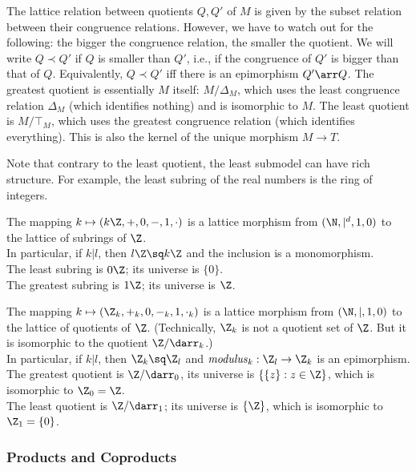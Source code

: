 The lattice relation between quotients $Q,Q'$ of $M$ is given by the subset relation between their congruence relations.
However, we have to watch out for the following: the bigger the congruence relation, the smaller the quotient.
We will write $Q\prec Q'$ if $Q$ is smaller than $Q'$, i.e., if the congruence of $Q'$ is bigger than that of $Q$.
Equivalently, $Q\prec Q'$ iff there is an epimorphism $Q'\arr Q$.
The greatest quotient is essentially $M$ itself: $M/\Delta_M$, which uses the least congruence relation $\Delta_M$ (which identifies nothing) and is isomorphic to $M$.
The least quotient is $M/\top_M$, which uses the greatest congruence relation (which identifies everything).
This is also the kernel of the unique morphism $M\to T$.

Note that contrary to the least quotient, the least submodel can have rich structure.
For example, the least subring of the real numbers is the ring of integers.

\begin{example}\quad
\begin{compactitem}
\item The mapping $k\mapsto (k\Z,+,0,-,1,\cdot)$ is a lattice morphism from $(\N,|^d,1,0)$ to the lattice of subrings of $\Z$.\\
In particular, if $k|l$, then $l\Z\sq k\Z$ and the inclusion is a monomorphism.\\
The least subring is $0\Z$; its universe is $\{0\}$.\\
The greatest subring is $1\Z$; its universe is $\Z$.
\item The mapping $k\mapsto (\Z_k,+_k,0,-_k,1,\cdot_k)$ is a lattice morphism from $(\N,|,1,0)$ to the lattice of quotients of $\Z$.
(Technically, $\Z_k$ is not a quotient set of $\Z$. But it is isomorphic to the quotient $\Z/\Equiv_k$.)\\
In particular, if $k|l$, then $\Z_k\sq \Z_l$ and $\modulus_k:\Z_l\to\Z_k$ is an epimorphism.\\
The greatest quotient is $\Z/\Equiv_0$, its universe is $\{\{z\}:z\in \Z\}$, which is isomorphic to $\Z_0=\Z$.\\
The least quotient is $\Z/\Equiv_1$; its universe is $\{\Z\}$, which is isomorphic to $\Z_1=\{0\}$.
\end{compactitem}
\end{example}

\subsubsection{Products and Coproducts}\label{sec:univ:meta:prodcoprod}

